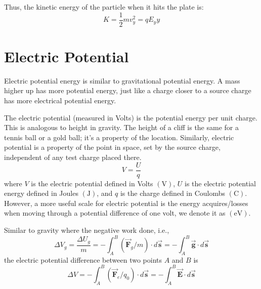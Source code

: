 Thus, the kinetic energy of the particle when it hits the plate is:
\begin{equation*}
  K = \frac{1}{2}mv_y^2 = qE_yy
\end{equation*}







\section{Electric Potential}
Electric potential energy is similar to gravitational potential energy. A mass higher up has more potential energy, just like a charge closer to a source charge has more electrical potential energy.

The electric potential (measured in Volts) is the potential energy per unit charge. This is analogous to height in gravity. The height of a cliff is the same for a tennis ball or a gold ball; it's a property of the location. Similarly, electric potential is a property of the point in space, set by the source charge, independent of any test charge placed there.
\begin{equation*}
  V=\frac{U}{q}
\end{equation*}
where $V$ is the electric potential defined in Volts $(\si{\volt})$, $U$ is the electric potential energy defined in Joules $(\si{\joule})$, and $q$ is the charge defined in Coulombs $(\si{\coulomb})$.
However, a more useful scale for electric potential is the energy acquires/losses when moving through a potential difference of one volt, we denote it as $(\si{\electronvolt})$.

Similar to gravity where the negative work done, i.e.,
\begin{equation*}
  \Delta V_g = \frac{\Delta U_g}{m} = -\int_A^B(\vec{\boldsymbol{F}}_g/m)\cdot d\vec{\boldsymbol{s}} = - \int_A^B\vec{\boldsymbol{g}}\cdot d\vec{\boldsymbol{s}}
\end{equation*}
the electric potential difference between two points $A$ and $B$ is 
\begin{equation}\label{eq:electric-potential-difference}
  \Delta V = -\int_A^B(\vec{\boldsymbol{F}}_e/q_0)\cdot d\vec{\boldsymbol{s}} = -\int_A^B\vec{\boldsymbol{E}}\cdot d\vec{\boldsymbol{s}}
\end{equation}


